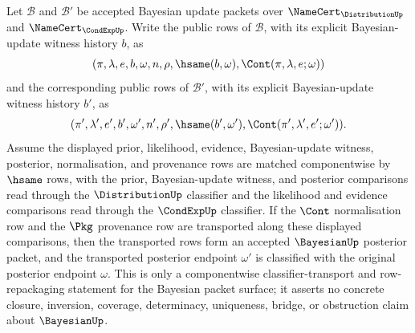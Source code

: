 \begin{theorem}
\label{thm:bayesian-posterior-classifier-transport}
Let $\mathcal{B}$ and $\mathcal{B}'$ be accepted Bayesian update packets over
$\NameCert_{\DistributionUp}$ and $\NameCert_{\CondExpUp}$. Write the public
rows of $\mathcal{B}$, with its explicit Bayesian-update witness history $b$, as
$$
(\pi,\lambda,e,b,\omega,n,\rho,
  \hsame(b,\omega),
  \Cont(\pi,\lambda,e;\omega))
$$
and the corresponding public rows of $\mathcal{B}'$, with its explicit
Bayesian-update witness history $b'$, as
$$
(\pi',\lambda',e',b',\omega',n',\rho',
  \hsame(b',\omega'),
  \Cont(\pi',\lambda',e';\omega')).
$$
Assume the displayed prior, likelihood, evidence, Bayesian-update witness,
posterior, normalisation, and provenance rows are matched componentwise by
$\hsame$ rows, with the prior, Bayesian-update witness, and posterior
comparisons read through the $\DistributionUp$ classifier and the likelihood
and evidence comparisons read through the $\CondExpUp$ classifier. If the
$\Cont$ normalisation row and the $\Pkg$ provenance row are transported along
these displayed comparisons, then the transported rows form an accepted
$\BayesianUp$ posterior packet, and the transported posterior endpoint
$\omega'$ is classified with the original posterior endpoint $\omega$. This is
only a componentwise classifier-transport and row-repackaging statement for the
Bayesian packet surface; it asserts no concrete closure, inversion, coverage,
determinacy, uniqueness, bridge, or obstruction claim about $\BayesianUp$.
\end{theorem}
